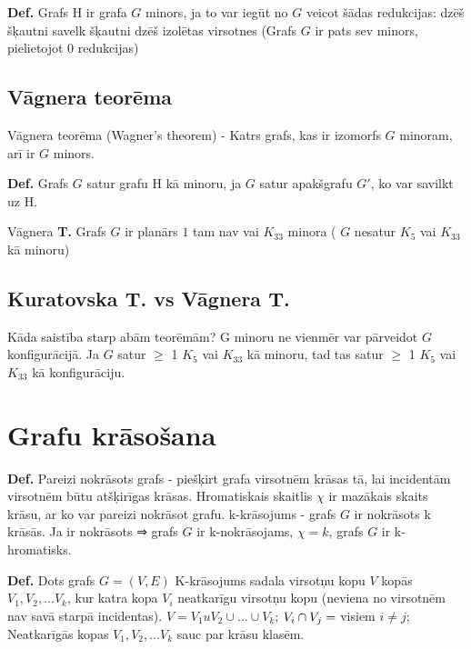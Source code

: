 \documentclass{article}
\begin{document}
\textbf{Def.}  Grafs H ir grafa $ G $ minors, ja to var iegūt no $ G $ veicot šādas redukcijas: dzēš šķautni savelk šķautni dzēš izolētas virsotnes (Grafs $ G $ ir pats sev minors, pielietojot 0 redukcijas)

\subsection{Vāgnera teorēma}

Vāgnera teorēma (Wagner's theorem) - Katrs grafs, kas ir izomorfs $ G $ minoram, arī ir $ G $ minors.

\textbf{Def.}  Grafs $ G $ satur grafu H kā minoru, ja $ G $ satur apakšgrafu $ G' $, ko var savilkt uz H.

Vāgnera \textbf{T. } Grafs $ G $ ir planārs $1$ tam nav vai $K_{33}$ minora ( $ G $  nesatur $K_5$ vai $K_{33}$ kā minoru)

\subsection{Kuratovska \textbf{T. } vs Vāgnera \textbf{T. }}
Kāda saistība starp abām teorēmām?
G minoru ne vienmēr var pārveidot $ G $ konfigurācijā. Ja $ G $ satur $\ge$ 1 $K_5$ vai $K_{33}$ kā minoru, tad tas satur $\ge$ 1 $K_5$ vai $K_{33}$ kā konfigurāciju.

\section{Grafu krāsošana}

\textbf{Def.}  Pareizi nokrāsots grafs - piešķirt grafa virsotnēm krāsas tā, lai incidentām virsotnēm būtu atšķirīgas krāsas.  Hromatiskais skaitlis $\chi $ ir mazākais skaits krāsu, ar ko var pareizi nokrāsot grafu.  k-krāsojums - grafs $ G $ ir nokrāsots k krāsās. Ja ir nokrāsots ⇒ grafs $ G $ ir k-nokrāsojams, $\chi = k$, grafs $ G $ ir k-hromatisks.

\textbf{Def.}  Dots grafs $G = (V , E )$ K-krāsojums sadala virsotņu kopu $V$ kopās $V_1  , V_2 , ...V_k$, kur katra kopa $V_i$ neatkarīgu virsotņu kopu (neviena no virsotnēm nav savā starpā incidentas).  $V = V_1 u V_2 \cup \ldots \cup V_k$; $V_i \cap V_j = \empty$ visiem $i \ne j$; Neatkarīgās kopas $V_1 , V_2 , \ldots V_k$ sauc par krāsu klasēm.
\end{document}
